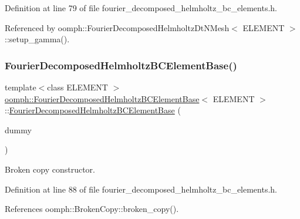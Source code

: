 Definition at line 79 of file fourier\+\_\+decomposed\+\_\+helmholtz\+\_\+bc\+\_\+elements.\+h.



Referenced by oomph\+::\+Fourier\+Decomposed\+Helmholtz\+Dt\+N\+Mesh$<$ E\+L\+E\+M\+E\+N\+T $>$\+::setup\+\_\+gamma().

\mbox{\label{classoomph_1_1FourierDecomposedHelmholtzBCElementBase_a76e278f8ff35a406344abfdb4a93c144}} 
\subsubsection{\texorpdfstring{Fourier\+Decomposed\+Helmholtz\+B\+C\+Element\+Base()}{FourierDecomposedHelmholtzBCElementBase()}\hspace{0.1cm}{\footnotesize\ttfamily [3/3]}}
{\footnotesize\ttfamily template$<$class E\+L\+E\+M\+E\+NT $>$ \\
\hyperlink{classoomph_1_1FourierDecomposedHelmholtzBCElementBase}{oomph\+::\+Fourier\+Decomposed\+Helmholtz\+B\+C\+Element\+Base}$<$ E\+L\+E\+M\+E\+NT $>$\+::\hyperlink{classoomph_1_1FourierDecomposedHelmholtzBCElementBase}{Fourier\+Decomposed\+Helmholtz\+B\+C\+Element\+Base} (\begin{DoxyParamCaption}\item[{const \hyperlink{classoomph_1_1FourierDecomposedHelmholtzBCElementBase}{Fourier\+Decomposed\+Helmholtz\+B\+C\+Element\+Base}$<$ E\+L\+E\+M\+E\+NT $>$ \&}]{dummy }\end{DoxyParamCaption})\hspace{0.3cm}{\ttfamily [inline]}}



Broken copy constructor. 



Definition at line 88 of file fourier\+\_\+decomposed\+\_\+helmholtz\+\_\+bc\+\_\+elements.\+h.



References oomph\+::\+Broken\+Copy\+::broken\+\_\+copy().



